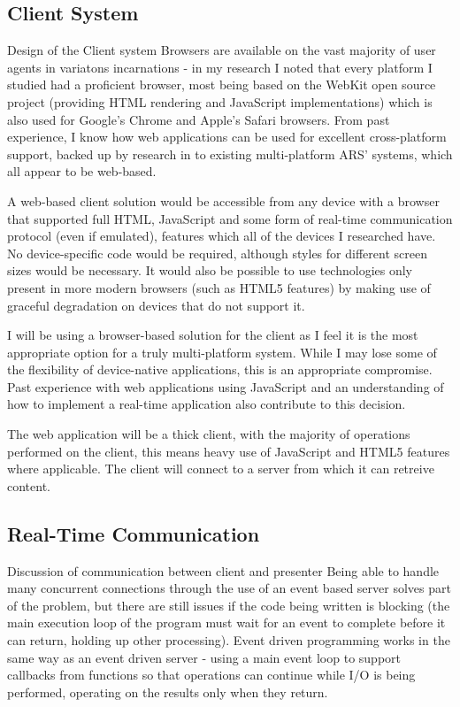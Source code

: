 \documentclass[a4papert,11pt,notitlepage]{ltxdoc}
\begin{document}
\subsection{Client System}
Design of the Client system
Browsers are available on the vast majority of user agents in variatons incarnations - in my research I noted that every platform I studied had a proficient browser, most being based on the WebKit\cite{webkit:web} open source project (providing HTML rendering and JavaScript implementations) which is also used for Google's Chrome and Apple's Safari browsers. From past experience, I know how web applications can be used for excellent cross-platform support, backed up by research in to existing multi-platform ARS' systems, which all appear to be web-based.

A web-based client solution would be accessible from any device with a browser that supported full HTML, JavaScript and some form of real-time communication protocol (even if emulated), features which all of the devices I researched have. No device-specific code would be required, although styles for different screen sizes would be necessary. It would also be possible to use technologies only present in more modern browsers (such as HTML5 features) by making use of graceful degradation on devices that do not support it.

I will be using a browser-based solution for the client as I feel it is the most appropriate option for a truly multi-platform system. While I may lose some of the flexibility of device-native applications, this is an appropriate compromise. Past experience with web applications using JavaScript and an understanding of how to implement a real-time application also contribute to this decision.

The web application will be a thick client, with the majority of operations performed on the client, this means heavy use of JavaScript and HTML5 features where applicable. The client will connect to a server from which it can retreive content.

\subsection{Real-Time Communication}
Discussion of communication between client and presenter
Being able to handle many concurrent connections through the use of an event based server solves part of the problem, but there are still issues if the code being written is blocking (the main execution loop of the program must wait for an event to complete before it can return, holding up other processing). Event driven programming works in the same way as an event driven server - using a main event loop to support callbacks from functions so that operations can continue while I/O is being performed, operating on the results only when they return.
\end{document}
